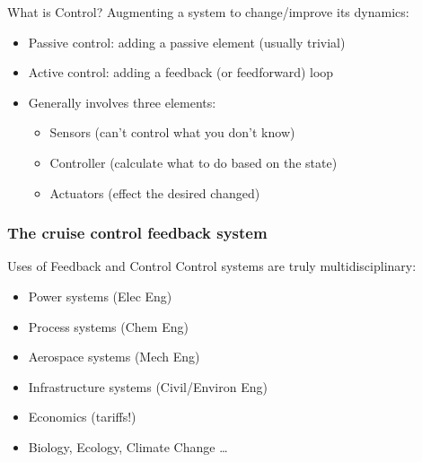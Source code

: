\documentclass{beamer-control}
\begin{document}
\begin{frame}{What is Control? }
Augmenting a system to change/improve its dynamics:
\begin{itemize}
\item Passive control: adding a passive element (usually trivial)
\item Active control: adding a feedback (or feedforward) loop
\item Generally involves three elements:
\begin{itemize}
\item Sensors (can't control what you don't know)
\item Controller (calculate what to do based on the state)
\item Actuators (effect the desired changed)
\end{itemize}
\end{itemize}
\end{frame}

\begin{frame}
\frametitle{The cruise control feedback system}

\end{frame}

\begin{frame}{Uses of Feedback and Control }
Control systems are truly multidisciplinary:
\begin{itemize}
\item Power systems (Elec Eng)
\item Process systems (Chem Eng)
\item Aerospace systems (Mech Eng)
\item Infrastructure systems (Civil/Environ Eng)
\item Economics (tariffs!)
\item Biology, Ecology, Climate Change \dots
\end{itemize}
\end{frame}
\end{document}
